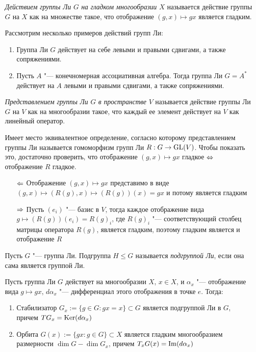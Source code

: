 \begin{definition}
	\textit{Действием группы Ли $G$ на гладком многообразии $X$} называется действие группы $G$ на $X$ как на множестве такое, что отображение $(g, x) \mapsto gx$ является гладким.
\end{definition}

\begin{example}
	Рассмотрим несколько примеров действий групп Ли:
	\begin{enumerate}
		\item Группа Ли $G$ действует на себе левыми и правыми сдвигами, а также сопряжениями.
		\item Пусть $A$ "--- конечномерная ассоциативная алгебра. Тогда группа Ли $G = A^*$ действует на $A$ левыми и правыми сдвигами, а также сопряжениями.
	\end{enumerate}
\end{example}

\begin{definition}
	\textit{Представлением группы Ли $G$ в пространстве $V$} называется действие группы Ли $G$ на $V$ как на многообразии такое, что каждый ее элемент действует на $V$ как линейный оператор.
\end{definition}

\begin{note}
	Имеет место эквивалентное определение, согласно которому представлением группы Ли называется гомоморфизм групп Ли $R : G \to \operatorname{GL}(V)$. Чтобы показать это, достаточно проверить, что отображение $(g, x) \mapsto gx$ гладкое $\Leftrightarrow$ отображение $R$ гладкое.
	\begin{itemize}
		\item[$\Leftarrow$] Отображение $(g, x) \mapsto gx$ представимо в виде $(g, x) \mapsto (R(g), x) \mapsto (R(g))(x) = gx$ и потому является гладким
		\item[$\Rightarrow$] Пусть $(e_i)$ "--- базис в $V$, тогда каждое отображение вида $g \mapsto (R(g))(e_i) = R(g)_i$, где $R(g)_i$ "--- соответствующий столбец матрицы оператора $R(g)$, является гладким, поэтому гладким является и отображение $R$
	\end{itemize}
\end{note}

\begin{definition}
	Пусть $G$ "--- группа Ли. Подгруппа $H \le G$ называется \textit{подгруппой Ли}, если она сама является группой Ли.
\end{definition}

\begin{theorem}
	Пусть группа Ли $G$ действует на многообразии $X$, $x \in X$, и $\alpha_x$ "--- отображение вида $g \mapsto gx$, $d\alpha_x$ "--- дифференциал этого отображения в точке $e$. Тогда:
	\begin{enumerate}
		\item Стабилизатор $G_x := \{g \in G: gx = x\} \subset G$ является подгруппой Ли в $G$, причем $TG_x = \operatorname{Ker} (d\alpha_x)$
		\item Орбита $G(x) := \{gx : g \in G\} \subset X$ является гладким многообразием размерности $\dim{G} - \dim{G_x}$, причем $T_xG(x) = \operatorname{Im}(d\alpha_x)$
	\end{enumerate}
\end{theorem}

